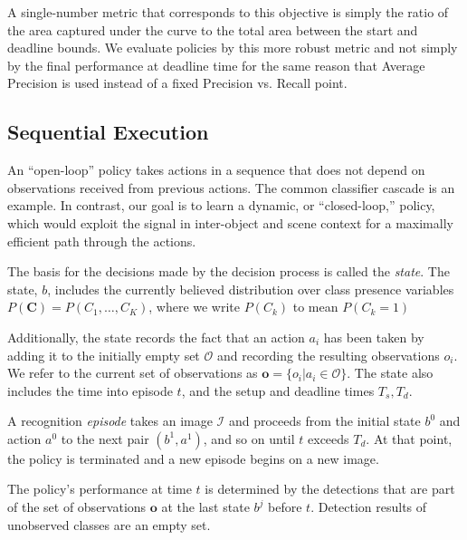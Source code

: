 A single-number metric that corresponds to this objective is simply the ratio of the area captured under the curve to the total area between the start and deadline bounds.
We evaluate policies by this more robust metric and not simply by the final performance at deadline time for the same reason that Average Precision is used instead of a fixed Precision vs. Recall point.

\subsection{Sequential Execution}
An ``open-loop'' policy takes actions in a sequence that does not depend on observations received from previous actions.
The common classifier cascade \cite{Viola2001} is an example.
In contrast, our goal is to learn a dynamic, or ``closed-loop,'' policy, which would exploit the signal in inter-object and scene context for a maximally efficient path through the actions.

The basis for the decisions made by the decision process is called the \emph{state}.
The state, $b$, includes the currently believed distribution over class presence variables $P(\mathbf{C}) = P(C_1, \dots, C_K)$, where we write $P(C_k)$ to mean $P(C_k=1)$

Additionally, the state records the fact that an action $a_i$ has been taken by adding it to the initially empty set $\mathcal{O}$ and recording the resulting observations $o_i$.
We refer to the current set of observations as $\mathbf{o} = \{o_i | a_i \in \mathcal{O}\}$.
The state also includes the time into episode $t$, and the setup and deadline times $T_s,T_d$.

A recognition \emph{episode} takes an image $\mathcal{I}$ and proceeds from the initial state $b^0$ and action $a^0$ to the next pair $(b^1,a^1)$, and so on until $t$ exceeds $T_d$.
At that point, the policy is terminated and a new episode begins on a new image.

The policy's performance at time $t$ is determined by the detections that are part of the set of observations $\mathbf{o}$ at the last state $b^j$ before $t$.
Detection results of unobserved classes are an empty set.


